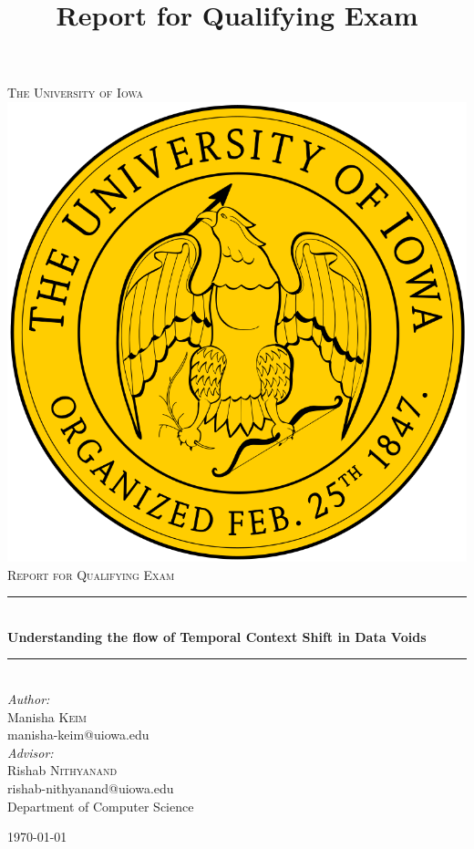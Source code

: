
\begin{titlepage}

\newcommand{\HRule}{\rule{\linewidth}{0.5mm}}
\center

\textsc{\LARGE The University of Iowa}\\[1.5cm]
\includegraphics[scale=.1]{figures/iowa}\\[1cm]
\textsc{\Large Report for Qualifying Exam}\\[0.5cm]
\title {Report for Qualifying Exam}
\HRule \\[0.4cm]
{ \huge \bfseries Understanding the flow of Temporal Context Shift in Data Voids}\\[0.4cm]
\HRule \\[1.5cm]


\emph{Author:} \\
Manisha \textsc{Keim} \\
manisha-keim@uiowa.edu \\[0.5cm]

\emph{Advisor:}\\
Rishab \textsc{Nithyanand}\\
rishab-nithyanand@uiowa.edu \\[0.5cm]

Department of Computer Science



{\today}\\[2cm]

\end{titlepage}